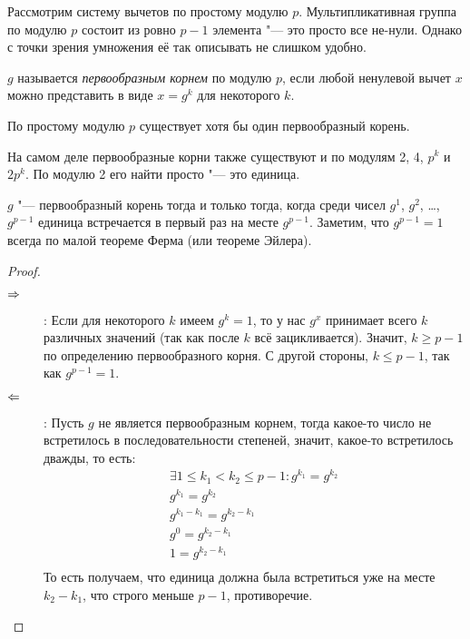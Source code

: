 Рассмотрим систему вычетов по простому модулю $p$.
Мультипликативная группа по модулю $p$ состоит из ровно $p-1$ элемента "--- это просто все не-нули.
Однако с точки зрения умножения её так описывать не слишком удобно.

\begin{Def}
$g$ называется \textit{первообразным корнем} по модулю $p$, если любой ненулевой вычет $x$ можно представить в виде $x=g^k$ для некоторого $k$.
\end{Def}

\begin{theorem}\label{PrimitiveRootExists}
По простому модулю $p$ существует хотя бы один первообразный корень.
\end{theorem}
\begin{Rem}
На самом деле первообразные корни также существуют и по модулям 2, 4, $p^k$ и $2p^k$.
По модулю 2 его найти просто "--- это единица.
\end{Rem}

\begin{theorem}\label{PrimitiveRootIff}
$g$ "--- первообразный корень тогда и только тогда, когда среди чисел $g^1$, $g^2$, \dots, $g^{p-1}$ единица встречается в первый раз на месте $g^{p-1}$.
Заметим, что $g^{p-1}=1$ всегда по малой теореме Ферма (или теореме Эйлера).
\end{theorem}
\begin{proof}
\begin{description}
\item[$\Rightarrow$]:
	Если для некоторого $k$ имеем $g^k=1$, то у нас $g^x$ принимает всего $k$ различных значений (так как после $k$ всё зацикливается).
	Значит, $k \ge p - 1$ по определению первообразного корня.
	С другой стороны, $k \le p - 1$, так как $g^{p-1}=1$.
\item[$\Leftarrow$]:
	Пусть $g$ не является первообразным корнем, тогда какое-то число не встретилось в последовательности степеней, значит, какое-то встретилось дважды,
	то есть:
	\begin{gather*}
	\exists 1 \le k_1 < k_2 \le p - 1\colon g^{k_1} = g^{k_2} \\
	g^{k_1} = g^{k_2} \\
	g^{k_1-k_1}= g^{k_2-k_1} \\
	g^0 = g^{k_2-k_1} \\
	1 = g^{k_2-k_1} \\
	\end{gather*}
	То есть получаем, что единица должна была встретиться уже на месте $k_2-k_1$, что строго меньше $p-1$, противоречие.
\end{description}
\end{proof}

